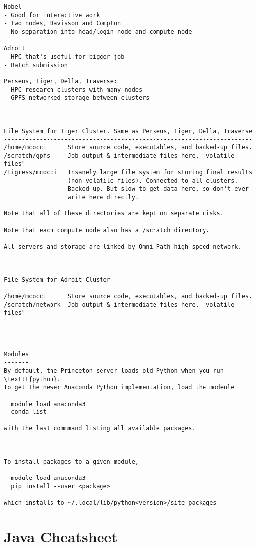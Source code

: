 \documentclass[12pt]{article}
\theoremstyle{plain}
\theoremstyle{definition}
\theoremstyle{remark}
\begin{document}
\begin{lstlisting}
Nobel
- Good for interactive work
- Two nodes, Davisson and Compton
- No separation into head/login node and compute node

Adroit
- HPC that's useful for bigger job
- Batch submission

Perseus, Tiger, Della, Traverse:
- HPC research clusters with many nodes
- GPFS networked storage between clusters



File System for Tiger Cluster. Same as Perseus, Tiger, Della, Traverse
----------------------------------------------------------------------
/home/mcocci      Store source code, executables, and backed-up files.
/scratch/gpfs     Job output & intermediate files here, "volatile files"
/tigress/mcocci   Insanely large file system for storing final results
                  (non-volatile files). Connected to all clusters.
                  Backed up. But slow to get data here, so don't ever
                  write here directly.

Note that all of these directories are kept on separate disks.

Note that each compute node also has a /scratch directory.

All servers and storage are linked by Omni-Path high speed network.



File System for Adroit Cluster
------------------------------
/home/mcocci      Store source code, executables, and backed-up files.
/scratch/network  Job output & intermediate files here, "volatile files"




Modules
-------
By default, the Princeton server loads old Python when you run
\texttt{python}.
To get the newer Anaconda Python implementation, load the modeule

  module load anaconda3
  conda list

with the last commmand listing all available packages.



To install packages to a given module,

  module load anaconda3
  pip install --user <package>

which installs to ~/.local/lib/python<version>/site-packages
\end{lstlisting}




\section{Java Cheatsheet}
\end{document}
